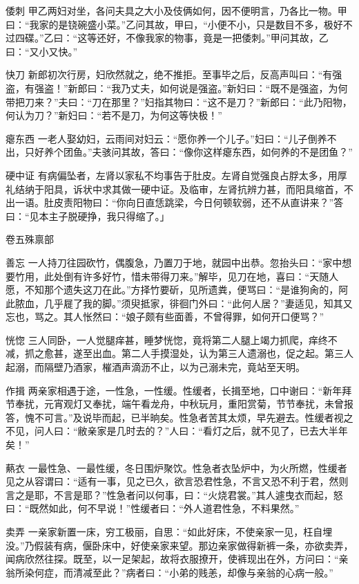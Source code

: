 \documentclass[12pt,UTF8]{ctexbook}
\begin{document}
倭刺
甲乙两妇对坐，各问夫具之大小及伎俩如何，因不便明言，乃各比一物。甲曰：“我家的是铙碗盛小菜。”乙问其故，甲曰，“小便不小，只是数目不多，极好不过四碟。”乙曰：“这等还好，不像我家的物事，竟是一把倭刺。”甲问其故，乙曰：“又小又快。”

快刀
新郎初次行房，妇欣然就之，绝不推拒。至事毕之后，反高声叫曰：“有强盗，有强盗！”新郎曰：“我乃丈夫，如何说是强盗。”新妇曰：“既不是强盗，为何带把刀来？”夫曰：“刀在那里？”妇指其物曰：“这不是刀？”新郎曰：“此乃阳物，何认为刀？”新妇曰：“若不是刀，为何这等快极！”

瘪东西
一老人娶幼妇，云雨间对妇云：“愿你养一个儿子。”妇曰：“儿子倒养不出，只好养个团鱼。”夫骇问其故，答曰：“像你这样瘪东西，如何养的不是团鱼？”

硬中证
有病偏坠者，左肾以家私不均事告于肚皮。左肾自觉强良占脬太多，用厚礼结纳于阳具，诉状中求其做一硬中证。及临审，左肾抗辨力甚，而阳具缩首，不出一语。肚皮责阳物曰：“你向日直恁跳梁，今日何顿软弱，还不从直讲来？”答曰：“见本主子脱硬挣，我只得缩了。」

卷五殊禀部

善忘
一人持刀往园砍竹，偶腹急，乃置刀于地，就园中出恭。忽抬头曰：“家中想要竹用，此处倒有许多好竹，惜未带得刀来。”解毕，见刀在地，喜曰：“天随人愿，不知那个遗失这刀在此。”方择竹要斫，见所遗粪，便骂曰：“是谁狗肏的，阿此脓血，几乎屣了我的脚。”须臾抵家，徘徊门外曰：“此何人居？”妻适见，知其又忘也，骂之。其人怅然曰：“娘子颇有些面善，不曾得罪，如何开口便骂？”

恍惚
三人同卧，一人觉腿痒甚，睡梦恍惚，竟将第二人腿上竭力抓爬，痒终不减，抓之愈甚，遂至出血。第二人手摸湿处，认为第三人遗溺也，促之起。第三人起溺，而隔壁乃酒家，槯酒声滴沥不止，以为己溺未完，竟站至天明。

作揖
两亲家相遇于途，一性急，一性缓。性缓者，长揖至地，口中谢曰：“新年拜节奉扰，元宵观灯又奉扰，端午看龙舟，中秋玩月，重阳赏菊，节节奉扰，未曾报答，愧不可言。”及说毕而起，已半晌矣。性急者苦其太烦，早先避去。性缓者视之不见，问人曰：“敝亲家是几时去的？”人曰：“看灯之后，就不见了，已去大半年矣！”

爇衣
一最性急、一最性缓，冬日围炉聚饮。性急者衣坠炉中，为火所燃，性缓者见之从容谓曰：“适有一事，见之已久，欲言恐君性急，不言又恐不利于君，然则言之是耶，不言是耶？”性急者问以何事，曰：“火烧君裳。”其人遽曳衣而起，怒曰：“既然如此，何不早说！”性缓者曰：“外人道君性急，不料果然。”

卖弄
一亲家新置一床，穷工极丽，自思：“如此好床，不使亲家一见，枉自埋没。”乃假装有病，偃卧床中，好使亲家来望。那边亲家做得新裤一条，亦欲卖弄，闻病欣然往探。既至，以一足架起，故将衣服撩开，使裤现出在外，方问曰：“亲翁所染何症，而清减至此？”病者曰：“小弟的贱恙，却像与亲翁的心病一般。”
\end{document}
